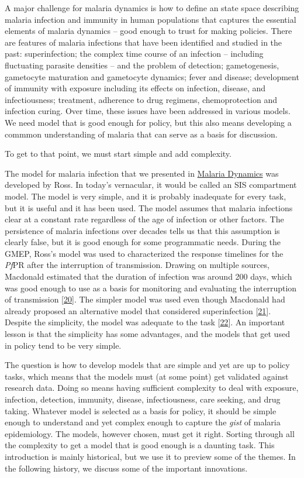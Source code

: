 \documentclass[
]{book}
\begin{document}
A major challenge for malaria dynamics is how to define an state space describing malaria infection and immunity in human populations that captures the essential elements of malaria dynamics -- good enough to trust for making policies. There are features of malaria infections that have been identified and studied in the past: superinfection; the complex time course of an infection -- including fluctuating parasite densities -- and the problem of detection; gametogenesis, gametocyte maturation and gametocyte dynamics; fever and disease; development of immunity with exposure including its effects on infection, disease, and infectiousness; treatment, adherence to drug regimens, chemoprotection and infection curing. Over time, these issues have been addressed in various models. We need model that is good enough for policy, but this also means developing a commmon understanding of malaria that can serve as a basis for discussion.

To get to that point, we must start simple and add complexity.

The model for malaria infection that we presented in \protect\hyperlink{malaria-dynamics}{Malaria Dynamics} was developed by Ross. In today's vernacular, it would be called an SIS compartment model. The model is very simple, and it is probably inadequate for every task, but it is useful and it has been used. The model assumes that malaria infections clear at a constant rate regardless of the age of infection or other factors. The persistence of malaria infections over decades tells us that this assumption is clearly false, but it is good enough for some programmatic needs. During the GMEP, Ross's model was used to characterized the response timelines for the \emph{Pf}PR after the interruption of transmission. Drawing on multiple sources, Macdonald estimated that the duration of infection was around 200 days, which was good enough to use as a basis for monitoring and evaluating the interruption of transmission {[}\protect\hyperlink{ref-MacdonaldG1964MalariaParasite}{20}{]}. The simpler model was used even though Macdonald had already proposed an alternative model that considered superinfection {[}\protect\hyperlink{ref-MacdonaldG1950_Superinfection}{21}{]}. Despite the simplicity, the model was adequate to the task {[}\protect\hyperlink{ref-SmithDL2009EndemicityResponse}{22}{]}. An important lesson is that the simplicity has some advantages, and the models that get used in policy tend to be very simple.

The question is how to develop models that are simple and yet are up to policy tasks, which means that the models must (at some point) get validated against research data. Doing so means having sufficient complexity to deal with exposure, infection, detection, immunity, disease, infectiousness, care seeking, and drug taking. Whatever model is selected as a basis for policy, it should be simple enough to understand and yet complex enough to capture the \emph{gist} of malaria epidemiology. The models, however chosen, must get it right. Sorting through all the complexity to get a model that is good enough is a daunting task. This introduction is mainly historical, but we use it to preview some of the themes. In the following history, we discuss some of the important innovations.
\end{document}

